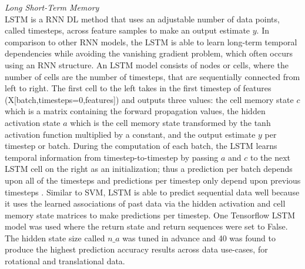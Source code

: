 \documentclass{ieeeaccess}
\begin{document}
\noindent \emph{Long Short-Term Memory}\\
LSTM is a RNN DL method that uses an adjustable number of data points, called timesteps, across feature samples to make an output estimate $y$. In comparison to other RNN models, the LSTM is able to learn long-term temporal dependencies while avoiding the vanishing gradient problem, which often occurs using an RNN structure. An LSTM model consists of nodes or cells, where the number of cells are the number of timesteps, that are sequentially connected from left to right. The first cell to the left takes in the first timestep of features (X[batch,timesteps=0,features]) and outputs three values: the cell memory state $c$ which is a matrix containing the forward propagation values, the hidden activation state $a$ which is the cell memory state transformed by the tanh activation function multiplied by a constant, and the output estimate $y$ per timestep or batch. During the computation of each batch, the LSTM learns temporal information from timestep-to-timestep by passing $a$ and $c$ to the next LSTM cell on the right as an initialization; thus a prediction per batch depends upon all of the timesteps and predictions per timestep only depend upon previous timesteps \cite{Sarang_2021_Tensorflow2, Ng_2021_Deep_learning_specialization}. Similar to SVM, LSTM is able to predict sequential data well because it uses the learned associations of past data via the hidden activation and cell memory state matrices to make predictions per timestep. One Tensorflow LSTM model was used where the return state and return sequences were set to False. The hidden state size called $n\_a$ was tuned in advance and 40 was found to produce the highest prediction accuracy results across data use-cases, for rotational and translational data.\\
\end{document}
